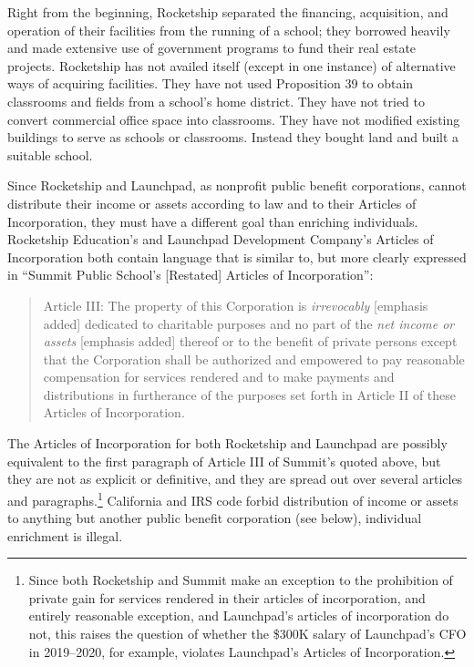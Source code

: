 Right from the beginning, Rocketship separated the financing, acquisition, and operation of their facilities from the running of a school; they borrowed heavily and made extensive use of government programs to fund their real estate projects. Rocketship has not availed itself (except in one instance) of alternative ways of acquiring facilities. They have not used Proposition 39 to obtain classrooms and fields from a school's home district. They have not tried to convert commercial office space into classrooms. They have not modified existing buildings to serve as schools or classrooms. Instead they bought land and built a suitable school.

Since Rocketship and Launchpad, as nonprofit public benefit corporations, cannot distribute their income or assets according to law and to their Articles of Incorporation, they must have a different goal than enriching individuals. Rocketship Education's and Launchpad Development Company's Articles of Incorporation both contain language that is similar to, but more clearly expressed in ``Summit Public School's [Restated] Articles of Incorporation'':
\begin{quotation}\noindent%
Article III: The property of this Corporation is \textit{irrevocably} [emphasis added] dedicated to charitable purposes and no part of the \textit{net income or assets} [emphasis added] thereof or to the benefit of private persons except that the Corporation shall be authorized and empowered to pay reasonable compensation for services rendered and to make payments and distributions in furtherance of the purposes set forth in Article II of these Articles of Incorporation. \parencite[2]{SummitPublicSchools2017}
\end{quotation}
The Articles of Incorporation for both Rocketship and Launchpad are possibly equivalent to the first paragraph of Article III of Summit's quoted above, but they are not as explicit or definitive, and they are spread out over several articles and paragraphs.\footnote{Since both Rocketship and Summit make an exception to the prohibition of private gain for services rendered in their articles of incorporation, and entirely reasonable exception, and Launchpad's articles of incorporation do not, this raises the question of whether the \$300K salary of Launchpad's CFO \parencite[7]{zotero-16512} in 2019–2020, for example, violates Launchpad's Articles of Incorporation.} California and IRS code forbid distribution of income or assets to anything but another public benefit corporation (see  below), individual enrichment is illegal. 

